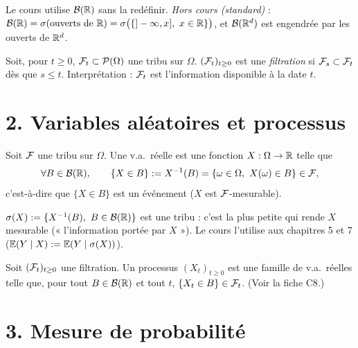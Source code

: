 \documentclass[11pt,a4paper]{article}
\begin{document}
\begin{remarque}
Le cours utilise $\mathcal{B}(\mathbb{R})$ sans la redéfinir. \emph{Hors cours (standard)} : $\mathcal{B}(\mathbb{R})=\sigma(\text{ouverts de }\mathbb{R})
=\sigma\bigl(\{]-\infty,x],\ x\in\mathbb{R}\}\bigr)$, et $\mathcal{B}(\mathbb{R}^d)$ est engendrée par les ouverts de $\mathbb{R}^d$.
\end{remarque}

\begin{definition}[Filtration]\label{C1:filtration}
Soit, pour $t\ge 0$, $\mathcal{F}_t\subset\mathcal{P}(\Omega)$ une tribu sur $\Omega$. $(\mathcal{F}_t)_{t\ge0}$ est une
\emph{filtration} si $\mathcal{F}_s\subset\mathcal{F}_t$ dès que $s\le t$. Interprétation : $\mathcal{F}_t$ est l'information disponible à la date $t$.
\end{definition}

\section*{2. Variables aléatoires et processus}

\begin{definition}\label{C1:va}
Soit $\mathcal{F}$ une tribu sur $\Omega$. Une v.a.\ réelle est une fonction $X:\Omega\to\mathbb{R}$ telle que
\[\forall B\in\mathcal{B}(\mathbb{R}),\qquad \{X\in B\}:=X^{-1}(B)=\{\omega\in\Omega,\ X(\omega)\in B\}\in\mathcal{F},\]
c'est-à-dire que $\{X\in B\}$ est un événement ($X$ est $\mathcal{F}$-mesurable).
\end{definition}

\begin{remarque}
$\sigma(X):=\{X^{-1}(B),\ B\in\Bc(\R)\}$ est une tribu : c'est la plus petite qui rende $X$ mesurable
(« l'information portée par $X$ »). Le cours l'utilise aux chapitres 5 et 7 ($\mathbb{E}(Y\mid X):=\mathbb{E}(Y\mid\sigma(X))$).
\end{remarque}

\begin{definition}\label{C1:processus}
Soit $(\mathcal{F}_t)_{t\ge0}$ une filtration. Un processus $(X_t)_{t\ge0}$ est une famille de v.a.\ réelles telle que,
pour tout $B\in\mathcal{B}(\mathbb{R})$ et tout $t$, $\{X_t\in B\}\in\mathcal{F}_t$. (Voir la fiche C8.)
\end{definition}

\section*{3. Mesure de probabilité}
\end{document}
